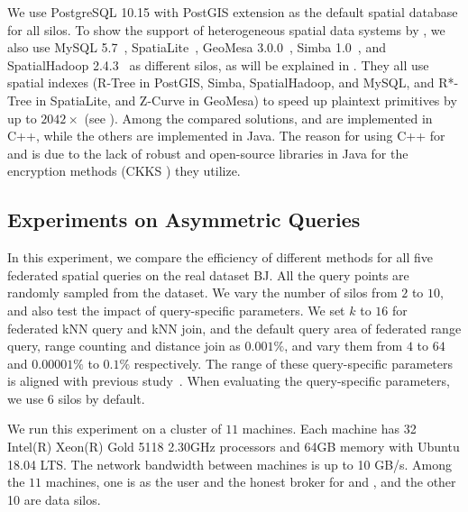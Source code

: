 We use PostgreSQL 10.15 with PostGIS extension as the default spatial database for all silos.
To show the support of heterogeneous spatial data systems by \sysname, we also use MySQL 5.7~\cite{mysql}, SpatiaLite~\cite{spatialite}, GeoMesa 3.0.0~\cite{ds15geomesa}, Simba 1.0~\cite{sigmod16simba}, and SpatialHadoop 2.4.3~\cite{icde15spatialhadoop} as different silos, as will be explained in .
They all use spatial indexes (R-Tree in PostGIS, Simba, SpatialHadoop, and MySQL, and R*-Tree in SpatiaLite, and Z-Curve in GeoMesa) to speed up plaintext primitives by up to $2042\times$ (see ).
Among the compared solutions, \EDBT and \ICDE are implemented in C++, while the others are implemented in Java.
The reason for using C++ for \EDBT and \ICDE is due to the lack of robust and open-source libraries in Java for the encryption methods (\eg CKKS \cite{DBLP:journals/csur/AcarAUC18}) they utilize.

\subsection{Experiments on Asymmetric Queries}
\label{subsec:exp-cmp}

In this experiment, we compare the efficiency of different methods for all five federated spatial queries on the real dataset BJ.
All the query points are randomly sampled from the dataset.
We vary the number of silos from $2$ to $10$, and also test the impact of query-specific parameters.
We set $k$ to $16$ for federated kNN query and kNN join, and the default query area of federated range query, range counting and distance join as $0.001\%$, and vary them from $4$ to $64$ and $0.00001\%$ to $0.1\%$ respectively.
The range of these query-specific parameters is aligned with previous study~\cite{sigmod16simba}.
When evaluating the query-specific parameters, we use $6$ silos by default.

We run this experiment on a cluster of $11$ machines.
Each machine has 32 Intel(R) Xeon(R) Gold 5118 2.30GHz processors and 64GB memory with Ubuntu 18.04 LTS. 
The network bandwidth between machines is up to 10 GB/s.
Among the $11$ machines, one is as the user and the honest broker for \smcql and \conclave, and the other 10 are data silos.

